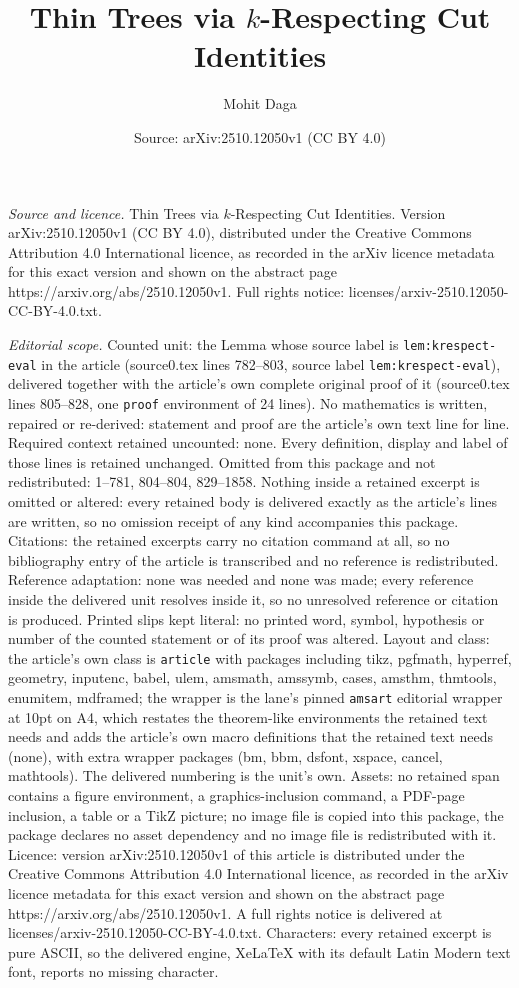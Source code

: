 \documentclass[10pt,a4paper]{amsart}
\title[Thin Trees via $k$-Respecting Cut Identities]{Thin Trees via $k$-Respecting Cut Identities}
\author{Mohit Daga}
\date{Source: arXiv:2510.12050v1 (CC BY 4.0)}
\begin{document}
\maketitle

\noindent\emph{Source and licence.} Thin Trees via $k$-Respecting Cut Identities. Version arXiv:2510.12050v1 (CC BY 4.0), distributed under the Creative Commons Attribution 4.0 International licence, as recorded in the arXiv licence metadata for this exact version and shown on the abstract page https://arxiv.org/abs/2510.12050v1. Full rights notice: licenses/arxiv-2510.12050-CC-BY-4.0.txt.\par\smallskip

\noindent\textit{Editorial scope.} Counted unit: the Lemma whose source label is \texttt{lem:krespect-eval} in the article (source0.tex lines 782--803, source label \texttt{lem:krespect-eval}), delivered together with the article's own complete original proof of it (source0.tex lines 805--828, one \texttt{proof} environment of 24 lines). No mathematics is written, repaired or re-derived: statement and proof are the article's own text line for line. Required context retained uncounted: none. Every definition, display and label of those lines is retained unchanged. Omitted from this package and not redistributed: 1--781, 804--804, 829--1858. Nothing inside a retained excerpt is omitted or altered: every retained body is delivered exactly as the article's lines are written, so no omission receipt of any kind accompanies this package. Citations: the retained excerpts carry no citation command at all, so no bibliography entry of the article is transcribed and no reference is redistributed. Reference adaptation: none was needed and none was made; every reference inside the delivered unit resolves inside it, so no unresolved reference or citation is produced. Printed slips kept literal: no printed word, symbol, hypothesis or number of the counted statement or of its proof was altered. Layout and class: the article's own class is \texttt{article} with packages including tikz, pgfmath, hyperref, geometry, inputenc, babel, ulem, amsmath, amssymb, cases, amsthm, thmtools, enumitem, mdframed; the wrapper is the lane's pinned \texttt{amsart} editorial wrapper at 10pt on A4, which restates the theorem-like environments the retained text needs and adds the article's own macro definitions that the retained text needs (none), with extra wrapper packages (bm, bbm, dsfont, xspace, cancel, mathtools). The delivered numbering is the unit's own. Assets: no retained span contains a figure environment, a graphics-inclusion command, a PDF-page inclusion, a table or a TikZ picture; no image file is copied into this package, the package declares no asset dependency and no image file is redistributed with it. Licence: version arXiv:2510.12050v1 of this article is distributed under the Creative Commons Attribution 4.0 International licence, as recorded in the arXiv licence metadata for this exact version and shown on the abstract page https://arxiv.org/abs/2510.12050v1. A full rights notice is delivered at licenses/arxiv-2510.12050-CC-BY-4.0.txt. Characters: every retained excerpt is pure ASCII, so the delivered engine, XeLaTeX with its default Latin Modern text font, reports no missing character.
\end{document}
